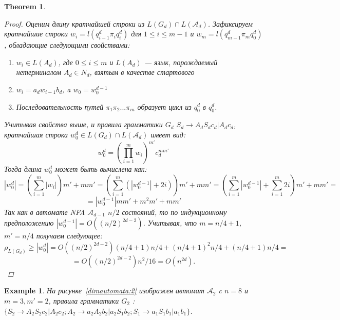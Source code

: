 \documentclass[11pt,a4paper]{article} %
\newtheorem{theorem}{Theorem}
\newtheorem{example}{Example}
\begin{document}
\begin{theorem}
\begin{proof}
Оценим длину кратчайшей строки из $L(G_d) \cap L(\mathcal{A}_{d})$. Зафиксируем кратчайшие строки $w_i = l(q^{d}_{i-1}\pi_iq^d_i)$ для $1 \le i \le m-1$ и $w_m = l(q^{d}_{m-1}\pi_mq^d_0)$, обладающие следующими свойствами:
\begin{enumerate}
\item $w_i \in L(A_d)$, где $0 \le i \le m$ и $L(A_d)$ --- язык, порождаемый нетерминалом $A_d \in N_d$, взятым в качестве стартового
\item $w_i = a_d w_{i-1} b_d$, a $w_0 = w_0^{d-1}$
\item Последовательность путей $\pi_1 \pi_2 ... \pi_m$ образует цикл из $q^d_0$ в $q^d_0$.
\end{enumerate}
Учитывая свойства выше, и правила грамматики $G_d$ $S_d \rightarrow A_dS_dc_d\vert A_dc_d$, кратчайшая строка $w_0^{d} \in L(G_d) \cap L(\mathcal{A}_{d})$ имеет вид:
$$w_0^{d} = ({\prod_{i=1}^m w_i})^{m'}{c}_d^{mm'}$$
Тогда длина $w_0^{d}$ может быть вычислена как:
$$|w_0^{d}| = ({\sum_{i=1}^m |w_i|})m' + mm' = (\sum_{i=1}^m (|w_0^{d-1}| + 2i))m' + mm'  = 
(\sum_{i=1}^m |w_0^{d-1}| + \sum_{i=1}^m 2i)m' + mm' = $$
$$ =  |w_0^{d-1}| m m' + m^2m' + mm' 
$$
Так как в автомате NFA $\mathcal{A}_{d-1}$ $n/2$ состояний, то по индукционному предположению $|w_0^{d-1}| =O( (n/2)^{2d - 2})$. Учитывая, что $m = n/4 +1$, $m' = n/4$ получаем следующее:
$$\rho_{L(G_d)} \ge |w_0^{d}| = O((n/2)^{2d - 2}) (n/4 + 1) n/4 + (n/4 + 1)^2 n/4  + (n/4 + 1) n/4 =$$ $$= O((n/2)^{2d - 2}) n^2/16 = O(n^{2d}).$$


\end{proof}
\end{theorem}
\begin{example}{}
На рисунке~\ref{dimautomata:2} изображен автомат $\mathcal{A}_{2}$ c $n = 8$ и $m = 3, m' = 2$, правила грамматики $G_2$ : $\{  S_2 \rightarrow A_2S_2c_2\vert A_2c_2; A_2 \rightarrow a_2A_2b_2 \vert  a_2S_1b_2; S_1 \rightarrow a_1S_1b_1 \vert a_1b_1\}$.
\end{example}
\end{document}
